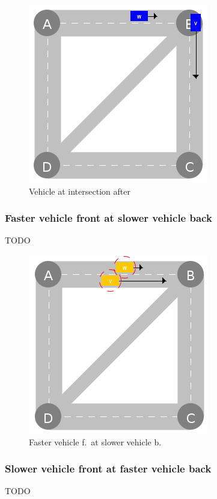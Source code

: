 \documentclass[graybox]{svmult}
\begin{document}
\begin{figure}[htbp]
	\centering
	\includegraphics[scale=0.5]{../../events/vehicle-at-intersection-after.png}
	\caption{Vehicle at intersection after}
	\label{fig:vehicle-at-intersection-after}
\end{figure}

\subsubsection{Faster vehicle front at slower vehicle back}
TODO

\begin{figure}[htbp]
	\centering
	\includegraphics[scale=0.5]{../../events/faster-vehicle-front-at-slower-vehicle-back.png}
	\caption{Faster vehicle f.\ at slower vehicle b.}
	\label{fig:faster-vehicle-front-at-slower-vehicle-back}
\end{figure}

\subsubsection{Slower vehicle front at faster vehicle back}
TODO
\end{document}
